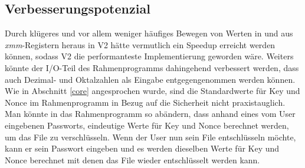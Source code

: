 \documentclass[course=erap]{aspdoc}
\begin{document}
\subsection{Verbesserungspotenzial}
Durch klügeres und vor allem weniger häufiges Bewegen von Werten in und aus \emph{xmm}-Registern heraus
in V2 hätte vermutlich ein Speedup erreicht werden können, sodass V2 die performanteste Implementierung
geworden wäre.
Weiters könnte der I/O-Teil des Rahmenprogramms dahingehend verbessert werden, dass auch Dezimal- und
Oktalzahlen als Eingabe entgegengenommen werden können.
Wie in Abschnitt \ref{core} angesprochen wurde, sind die Standardwerte für Key und Nonce im Ra\-hmen\-pro\-gramm 
in Bezug auf die Sicherheit nicht praxistauglich.
Man könnte in das Ra\-hmen\-pro\-gramm so abändern, dass anhand eines vom User eingebenen Passworts, 
eindeutige Werte für Key und Nonce berechnet werden, um das File zu verschlüsseln. Wenn der User nun 
sein File entschlüsseln möchte, kann er sein Passwort eingeben und es werden dieselben Werte für 
Key und Nonce berechnet mit denen das File wieder entschlüsselt werden kann.


{}
\end{document}
